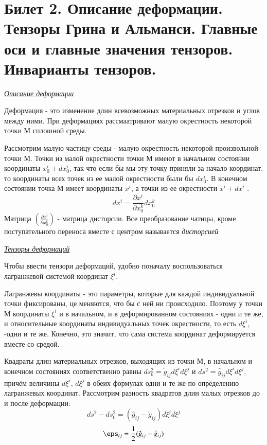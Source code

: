 \newpage
\section{Билет 2. Описание деформации. Тензоры Грина и Альманси. Главные оси и главные значения тензоров. Инварианты тензоров.}

\begin{center}
	\textit{\underline{Описание деформации}}
\end{center}

Деформация - это изменение длин всевозможных материальных отрезков и углов между ними. При деформациях рассмаатривают малую окрестность некоторой точки М сплошной среды. 

Рассмотрим малую частицу среды - малую окрестность некоторой произвольной точки М. Точки из малой окрестности точки М имеют в начальном состоянии координаты $x_0^i+dx_0^i$, так что если бы мы эту точку приняли за начало координат, то координаты всех точек из ее малой окрестности были бы $dx_0^i$. В конечном состоянии точка М имеет координаты $x^i$, а точки из ее окрестности $x^i+dx^i$ .
$$dx^i=\frac{\partial x^i}{\partial x_0^k}dx_0^k$$
Матрица $\left( \frac {\partial x^i}{\partial x_0^k}\right)$ - матрица дисторсии. Все преобразование чатицы, кроме поступательного переноса вместе с центром называется \textit{дисторсией}

\begin{center}
	\textit{\underline{Тензоры деформаций}}
\end{center}
Чтобы ввести тензори деформаций, удобно поначалу воспользоваться лагранжевой системой координат $\xi^i$.

Лагранжевы координаты - это параметры, которые для каждой индивидуальной точки фиксированы, це меняются, что бы с ней ни происходило. Поэтому у точки М координаты $\xi^i$ и в начальном, и в деформированном состояниях - одни и те же, и относительные координаты индивидуальных точек окрестности, то есть $d\xi^i$, -одни и те же. Конечно, это значит, что сама система координат деформируется вместе со средой. 

Квадраты длин материальных отрезков, выходящих из точки М, в начальном и конечном состояниях соответственно равны $ds_0^2 = \mathring{g}_{ij}d\xi^id\xi^j$ и $ds^2 = \hat{g}_{ij}d\xi^id\xi^j$, причём величины $d\xi^i$, $d\xi^j$ в обеих формулах одни и те же по определению лагранжевых координат. Рассмотрим разность квадратов длин малых отрезков до и после деформации: $$ds^2 - ds_0^2 = (\hat{g}_{ij} - \mathring{g}_{ij})d\xi^id\xi^j$$
$$\eps_{ij} = \frac{1}{2}(\hat{g}_{ij} - \mathring{g}_{ij})$$

